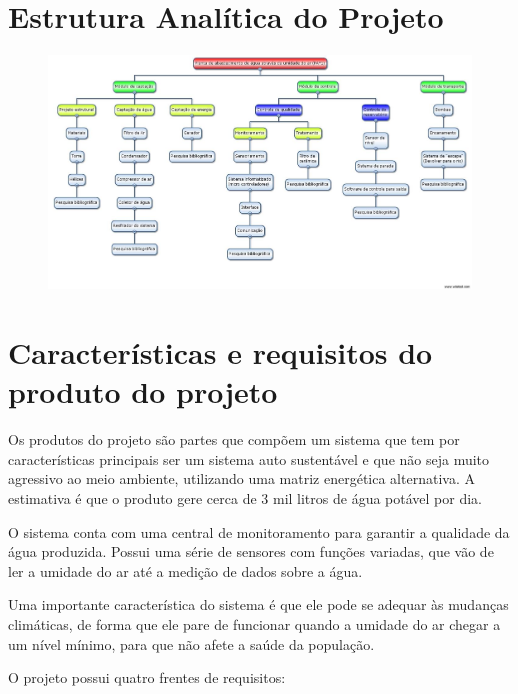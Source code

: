 \pagebreak
\section*{Estrutura Analítica do Projeto}

  \begin{figure}[h]
  \begin{center}
    \includegraphics[scale=0.3]{editaveis/figuras/EAP}
    \label{EAP}
  \end{center}
  \end{figure}
  \FloatBarrier
  
\section*{Características e requisitos do produto do projeto}

  Os produtos do projeto são partes que compõem um sistema que tem por características principais ser um sistema auto sustentável
  e que não seja muito agressivo ao meio ambiente, utilizando uma matriz energética alternativa.
  A estimativa é que o produto gere cerca de 3 mil litros de água potável por dia.
  
  O sistema conta com uma central de monitoramento para garantir a qualidade da água produzida. Possui uma série de sensores
  com funções variadas, que vão de ler a umidade do ar até a medição de dados sobre a água.
  
  Uma importante característica do sistema é que ele pode se adequar às mudanças climáticas, de forma que ele pare de
  funcionar quando a umidade do ar chegar a um nível mínimo, para que não afete a saúde da população.
  
  O projeto possui quatro frentes de requisitos:
  
